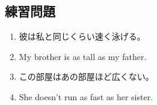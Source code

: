 \subsection{練習問題}\vspace{-0.55em}
    \begin{enumerate}[leftmargin=*, nosep, itemsep=1.5em]
        \item 彼は私と同じくらい速く泳げる。
        \item My brother is as tall as my father.
        \item この部屋はあの部屋ほど広くない。
        \item She doesn't run as fast as her sister.
    \end{enumerate}

\newpage
